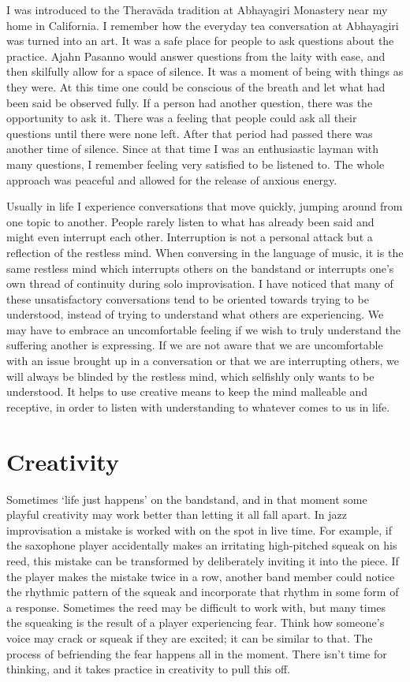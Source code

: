 I was introduced to the Theravāda tradition at Abhayagiri Monastery near
my home in California. I remember how the everyday tea conversation at
Abhayagiri was turned into an art. It was a safe place for people to ask
questions about the practice. Ajahn Pasanno would answer questions from
the laity with ease, and then skilfully allow for a space of silence. It
was a moment of being with things as they were. At this time one could
be conscious of the breath and let what had been said be observed fully. 
If a person had another question, there was the opportunity to ask it. 
There was a feeling that people could ask all their questions until
there were none left. After that period had passed there was another
time of silence. Since at that time I was an enthusiastic layman with
many questions, I remember feeling very satisfied to be listened to. The
whole approach was peaceful and allowed for the release of anxious
energy. 

Usually in life I experience conversations that move quickly, jumping
around from one topic to another. People rarely listen to what has
already been said and might even interrupt each other. Interruption is
not a personal attack but a reflection of the restless mind. When
conversing in the language of music, it is the same restless mind which
interrupts others on the bandstand or interrupts one's own thread of
continuity during solo improvisation. I have noticed that many of these
unsatisfactory conversations tend to be oriented towards trying to be
understood, instead of trying to understand what others are
experiencing. We may have to embrace an uncomfortable feeling if we wish
to truly understand the suffering another is expressing. If we are not
aware that we are uncomfortable with an issue brought up in a
conversation or that we are interrupting others, we will always be
blinded by the restless mind, which selfishly only wants to be
understood. It helps to use creative means to keep the mind malleable
and receptive, in order to listen with understanding to whatever comes
to us in life. 

\section{Creativity}

Sometimes `life just happens' on the bandstand, and in that moment some
playful creativity may work better than letting it all fall apart. In
jazz improvisation a mistake is worked with on the spot in live time. 
For example, if the saxophone player accidentally makes an irritating
high-pitched squeak on his reed, this mistake can be transformed by
deliberately inviting it into the piece. If the player makes the mistake
twice in a row, another band member could notice the rhythmic pattern of
the squeak and incorporate that rhythm in some form of a response. 
Sometimes the reed may be difficult to work with, but many times the
squeaking is the result of a player experiencing fear. Think how
someone's voice may crack or squeak if they are excited; it can be
similar to that. The process of befriending the fear happens all in the
moment. There isn't time for thinking, and it takes practice in
creativity to pull this off. 

